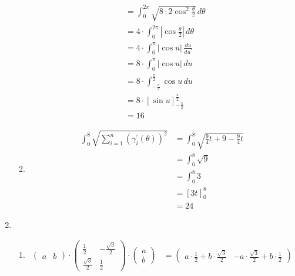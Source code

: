\documentclass[]{book}
\theoremstyle{definition}
\begin{document}
\begin{enumerate}
\begin{enumerate}
\begin{align*}
                & = \int_0^{2\pi} \sqrt{8 \cdot 2\cos^2 \frac{\theta}{2}} \, d\theta \\
                & = 4 \cdot \int_0^{2\pi} | \cos \frac{\theta}{2}| \, d\theta \\
                & = 4 \cdot \int_0^{\pi} |\cos u| \, \frac{du}{du^\prime} \\
                & = 8 \cdot \int_0^{\pi} |\cos u| \, du \\
                & = 8 \cdot \int_{-\frac{\pi}{2}}^{\frac{\pi}{2}} \cos u \, du \\
                & = 8 \cdot [\sin u]_{-\frac{\pi}{2}}^{\frac{\pi}{2}} \\
                & = 16
            \end{align*}
            \item \begin{align*}
                \int_0^{8} \sqrt{ \sum_{i=1}^{n} (\gamma^\prime_i(\theta))^2 } & = \int_0^{8} \sqrt{\frac{9}{4}t + 9 - \frac{9}{4} t} \\
                & = \int_0^{8} \sqrt{9} \\
                & = \int_0^{8} 3 \\
                & = [3t]_0^8 \\
                & = 24
            \end{align*}
        \end{enumerate}
            \item 
            \begin{enumerate}
                \item\begin{align*}
                \begin{pmatrix}
                    a & b
                \end{pmatrix}
                \cdot
                \begin{pmatrix}
                    \frac{1}{2} & -\frac{\sqrt{3}}{2} \\
                    \frac{\sqrt{3}}{2} & \frac{1}{2}
                \end{pmatrix}
                \cdot
                \begin{pmatrix}
                    a \\
                    b
                \end{pmatrix} & = 
                \begin{pmatrix}
                    a \cdot \frac{1}{2} + b \cdot \frac{\sqrt{3}}{2} & 
                    -a \cdot \frac{\sqrt{3}}{2} + b \cdot \frac{1}{2}

\end{pmatrix}
\end{align*}
\end{enumerate}
\end{enumerate}
\end{document}
